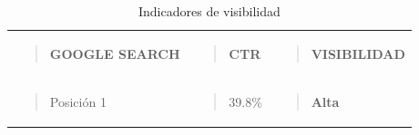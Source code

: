 \documentclass[
  spanish,
  11pt,
  a4paper,
]{scrbook}
\begin{document}
\begin{longtable}[]{@{}
  >{\raggedright\arraybackslash}p{}
  >{\raggedright\arraybackslash}p{}
  >{\raggedright\arraybackslash}p{}@{}}
\caption{Indicadores de visibilidad}\label{tbl-1}\tabularnewline
\toprule\noalign{}
\endfirsthead
\endhead
\bottomrule\noalign{}
\endlastfoot
\begin{minipage}[t]{\linewidth}\raggedright
\begin{quote}
\textbf{GOOGLE SEARCH}
\end{quote}
\end{minipage} & \begin{minipage}[t]{\linewidth}\raggedright
\begin{quote}
\textbf{CTR}
\end{quote}
\end{minipage} & \begin{minipage}[t]{\linewidth}\raggedright
\begin{quote}
\textbf{VISIBILIDAD}
\end{quote}
\end{minipage} \\
\begin{minipage}[t]{\linewidth}\raggedright
\begin{quote}
Posición 1
\end{quote}
\end{minipage} & \begin{minipage}[t]{\linewidth}\raggedright
\begin{quote}
39.8\%
\end{quote}
\end{minipage} & \begin{minipage}[t]{\linewidth}\raggedright
\begin{quote}
\textbf{Alta}


\end{quote}
\end{minipage}
\end{longtable}
\end{document}
